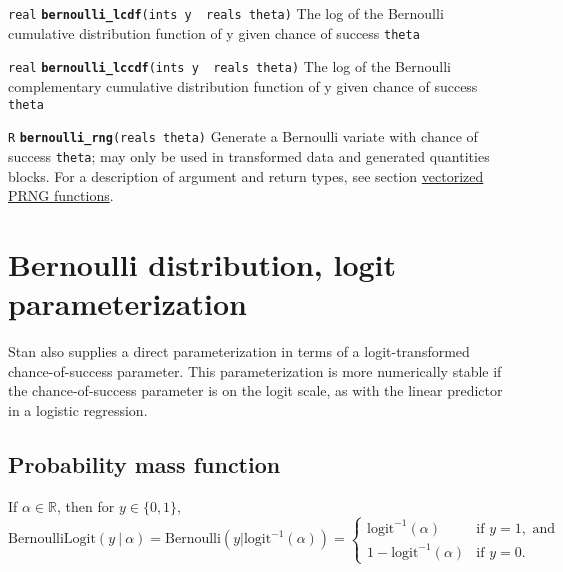 \documentclass[
  10pt,
]{book}
\begin{document}
\texttt{real} \textbf{\texttt{bernoulli\_lcdf}}\texttt{(ints\ y\ \textbar{}\ reals\ theta)}\newline
The log of the Bernoulli cumulative distribution function of y given
chance of success \texttt{theta}


\texttt{real} \textbf{\texttt{bernoulli\_lccdf}}\texttt{(ints\ y\ \textbar{}\ reals\ theta)}\newline
The log of the Bernoulli complementary cumulative distribution
function of y given chance of success \texttt{theta}


\texttt{R} \textbf{\texttt{bernoulli\_rng}}\texttt{(reals\ theta)}\newline
Generate a Bernoulli variate with chance of success \texttt{theta}; may only be
used in transformed data and generated quantities blocks.
For a description of argument and return types, see section
\protect\hyperlink{prng-vectorization}{vectorized PRNG functions}.

\hypertarget{bernoulli-logit-distribution}{%
\section{Bernoulli distribution, logit parameterization}\label{bernoulli-logit-distribution}}

Stan also supplies a direct parameterization in terms of a
logit-transformed chance-of-success parameter. This parameterization
is more numerically stable if the chance-of-success parameter is on
the logit scale, as with the linear predictor in a logistic
regression.

\hypertarget{probability-mass-function-1}{%
\subsection{Probability mass function}\label{probability-mass-function-1}}

If \(\alpha \in \mathbb{R}\), then for \(y \in \{0,1\}\), \[
\text{BernoulliLogit}(y~|~\alpha) = \text{Bernoulli}(y |
\text{logit}^{-1}(\alpha)) = \left\{ \begin{array}{ll}
\text{logit}^{-1}(\alpha) & \text{if } y = 1, \text{ and} \\ 1 -
\text{logit}^{-1}(\alpha) &  \text{if } y = 0. \end{array} \right. \]
\end{document}

